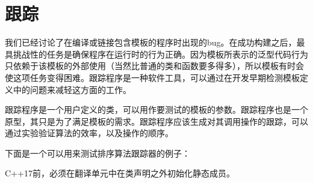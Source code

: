 \section{跟踪}
我们已经讨论了在编译或链接包含模板的程序时出现的bug。在成功构建之后，最具挑战性的任务是确保程序在运行时的行为正确。因为模板所表示的泛型代码行为只依赖于该模板的外部使用（当然比普通的类和函数要多得多），所以模板有时会使这项任务变得困难。跟踪程序是一种软件工具，可以通过在开发早期检测模板定义中的问题来减轻这方面的工作。

跟踪程序是一个用户定义的类，可以用作要测试的模板的参数。跟踪程序也是一个原型，其只是为了满足模板的需求。跟踪程序应该生成对其调用操作的跟踪，可以通过实验验证算法的效率，以及操作的顺序。

下面是一个可以用来测试排序算法跟踪器的例子：

\begin{notice}
C++17前，必须在翻译单元中在类声明之外初始化静态成员。
\end{notice}

